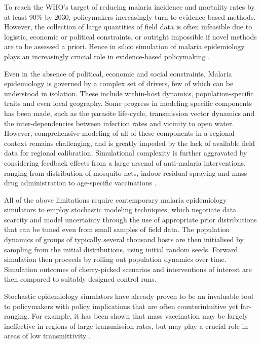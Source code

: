 \documentclass{article}
\begin{document}
To reach the WHO’s target of reducing malaria incidence and mortality rates by at least 90\% by 2030, policymakers increasingly turn to evidence-based methods\cite{who_global_2015}. However, the collection of large quantities of field data is often infeasible due to logistic, economic or political constraints, or outright impossible if novel methods are to be assessed a priori. Hence in silico simulation of malaria epidemiology plays an increasingly crucial role in evidence-based policymaking \cite{mwendera_challenges_2019}.

Even in the absence of political, economic and social constraints, Malaria epidemiology is governed by a complex set of drivers, few of which can be understood in isolation. These include within-host dynamics, population-specific traits and even local geography. Some progress in modeling specific components has been made, such as the parasite life-cycle, transmission vector dynamics and the inter-dependencies between infection rates and vicinity to open water. However, comprehensive modeling of all of these components in a regional context remains challenging, and is greatly impeded by the lack of available field data for regional calibration. Simulational complexity is further aggravated by considering feedback effects from a large arsenal of anti-malaria interventions, ranging from distribution of mosquito nets, indoor residual spraying and mass drug administration to age-specific vaccinations \cite{smith_ensemble_2012}. 

All of the above limitations require contemporary malaria epidemiology simulators to employ stochastic modeling techniques, which negotiate data scarcity and model uncertainty through the use of appropriate prior distributions that can be tuned even from small samples of field data. The population dynamics of groups of typically several thousand hosts are then initialised by sampling from the initial distributions, using initial random seeds. Forward simulation then proceeds by rolling out population dynamics over time. Simulation outcomes of cherry-picked scenarios and interventions of interest are then compared to suitably designed control runs.

Stochastic epidemiology simulators have already proven to be an invaluable tool to policymakers with policy implications that are often counterintuitive yet far-ranging. For example, it has been shown that mass vaccination may be largely ineffective in regions of large transmission rates, but may play a crucial role in areas of low transmittivity \cite{smith_ensemble_2012}.
\end{document}
